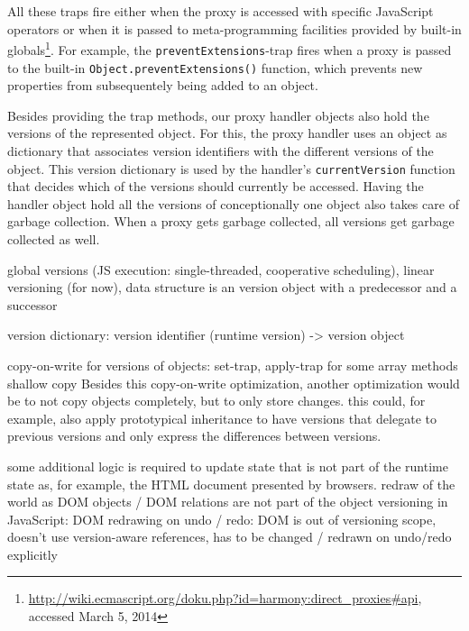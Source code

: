 All these traps fire either when the proxy is accessed with specific JavaScript operators or when it is passed to meta-programming facilities provided by built-in globals\footnote{\url{http://wiki.ecmascript.org/doku.php?id=harmony:direct_proxies\#api}, accessed March 5, 2014}.
For example, the \lstinline{preventExtensions}-trap fires when a proxy is passed to the built-in \lstinline{Object.preventExtensions()} function, which prevents new properties from subsequentely being added to an object.

Besides providing the trap methods, our proxy handler objects also hold the versions of the represented object.
For this, the proxy handler uses an object as dictionary that associates version identifiers with the different versions of the object.
This version dictionary is used by the handler's \lstinline{currentVersion} function that decides which of the versions should currently be accessed.
Having the handler object hold all the versions of conceptionally one object also takes care of garbage collection.
When a proxy gets garbage collected, all versions get garbage collected as well.





global versions (JS execution: single-threaded, cooperative scheduling), linear versioning (for now), data structure is an version object with a predecessor and a successor

version dictionary: version identifier (runtime version) -> version object

copy-on-write for versions of objects: set-trap, apply-trap for some array methods
shallow copy
Besides this copy-on-write optimization, another optimization would be to not copy objects completely, but to only store changes.
this could, for example, also apply prototypical inheritance to have versions that delegate to previous versions and only express the differences between versions.

some additional logic is required to update state that is not part of the runtime state as, for example, the HTML document presented by browsers.
redraw of the world as DOM objects / DOM relations are not part of the object versioning in JavaScript: DOM redrawing on undo / redo: DOM is out of versioning scope, doesn’t use version-aware references, has to be changed / redrawn on undo/redo explicitly
















